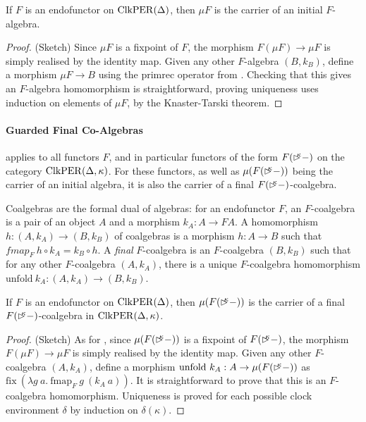 \begin{theorem}\label{thm:initial-f-algebra}
  If $F$ is an endofunctor on $\mathrm{ClkPER}(\Delta)$, then $\mu F$ is the
  carrier of an initial $F$-algebra.
\end{theorem}

\begin{proof} (Sketch) Since $\mu F$ is a fixpoint of $F$, the
  morphism $F(\mu F) \to \mu F$ is simply realised by the identity
  map. Given any other $F$-algebra $(B,k_B)$, define a morphism $\mu F
  \to B$ using the $\mathrm{primrec}$ operator from
  . Checking that this gives an
  $F$-algebra homomorphism is straightforward, proving uniqueness uses
  induction on elements of $\mu F$, by the Knaster-Tarski theorem.
\end{proof}

\paragraph{Guarded Final Co-Algebras} 
applies to all functors $F$, and in particular functors of the form
$F(\mathord{\rhd\kern-0.4em^{\kappa}}-)$ on the category $\mathrm{ClkPER}(\Delta, \kappa)$. For
these functors, as well as $\mu (F(\mathord{\rhd\kern-0.4em^{\kappa}} -))$ being the carrier
of an initial algebra, it is also the carrier of a final
$F(\mathord{\rhd\kern-0.4em^{\kappa}}-)$-coalgebra.

Coalgebras are the formal dual of algebras: for an endofunctor $F$, an
$F$-coalgebra is a pair of an object $A$ and a morphism $k_A : A \to
FA$. A homomorphism $h : (A,k_A) \to (B,k_B)$ of coalgebras is a
morphism $h : A \to B$ such that $\mathit{fmap}_F~h \circ k_A =
k_B\circ h$. A \emph{final} $F$-coalgebra is an $F$-coalgebra
$(B,k_B)$ such that for any other $F$-coalgebra $(A,k_A)$, there is a
unique $F$-coalgebra homomorphism $\mathrm{unfold}~k_A : (A,k_A) \to
(B,k_B)$.

\begin{theorem}\label{thm:final-f-de-coalgebra}
  If $F$ is an endofunctor on $\mathrm{ClkPER}(\Delta)$, then $\mu
  (F(\mathord{\rhd\kern-0.4em^{\kappa}}-))$ is the carrier of a final
  $F(\mathord{\rhd\kern-0.4em^{\kappa}}-)$-coalgebra in $\mathrm{ClkPER}(\Delta,\kappa)$.
\end{theorem}

\begin{proof} (Sketch) As for , since
  $\mu (F(\mathord{\rhd\kern-0.4em^{\kappa}}-))$ is a fixpoint of $F(\mathord{\rhd\kern-0.4em^{\kappa}}-)$, the
  morphism $F(\mu F) \to \mu F$ is simply realised by the identity
  map. Given any other $F$-coalgebra $(A,k_A)$, define a morphism
  $\mathrm{unfold}~k_A : A \to \mu(F(\mathord{\rhd\kern-0.4em^{\kappa}}-))$ as
  $\mathrm{fix}~(\lambda g~a.~\mathrm{fmap}_F~g~(k_A~a))$. It is
  straightforward to prove that this is an $F$-coalgebra
  homomorphism. Uniqueness is proved for each possible clock
  environment $\delta$ by induction on $\delta(\kappa)$.
\end{proof}

